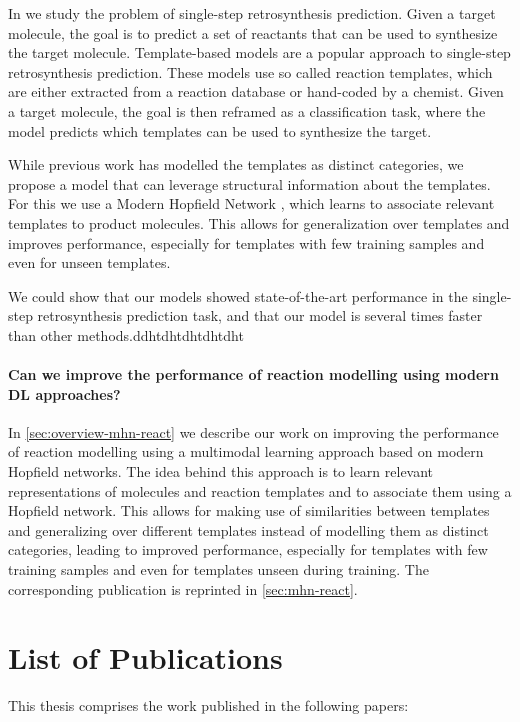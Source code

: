 In \citep{seidlImprovingFewZeroShot2022} we study the problem of single-step
retrosynthesis prediction. Given a target molecule, the goal is to predict a
set of reactants that can be used to synthesize the target molecule.
Template-based models are a popular approach to single-step retrosynthesis
prediction. These models use so called reaction templates, which are
either extracted from a reaction database or hand-coded by a chemist.
Given a target molecule, the goal is then reframed as a classification task,
where the model predicts which templates can be used to synthesize the target.

While previous work has modelled the templates as distinct categories, we
propose a model that can leverage structural information about the templates.
For this we use a Modern Hopfield Network \citep{ramsauerHopfieldNetworksAll2020}, which
learns to associate relevant templates to product molecules.
This allows for generalization over templates and improves performance, especially
for templates with few training samples and even for unseen templates.

We could show that our models showed state-of-the-art performance in
the single-step retrosynthesis prediction task, and that our model is several
times faster than other methods.ddhtdhtdhtdhtdht

\paragraph{Can we improve the performance of reaction modelling using modern DL approaches?}
In \cref{sec:overview-mhn-react} we describe our work on improving the performance
of reaction modelling using a multimodal learning approach based on modern
Hopfield networks. The idea behind this approach is to learn relevant representations
of molecules and reaction templates and to associate them using a Hopfield network.
This allows for making use of similarities between templates and generalizing over
different templates instead of modelling them as distinct categories, leading to
improved performance, especially for templates with few training samples and even
for templates unseen during training.
The corresponding publication is reprinted in \cref{sec:mhn-react}.

\section{List of Publications\label{sec:publications}}
This thesis comprises the work published in the following papers:

